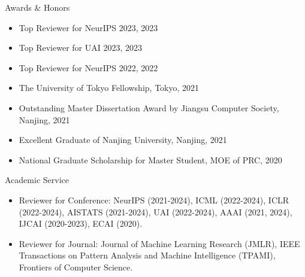 \documentclass{resume} %
\begin{document}





\begin{rSection}{Awards \& Honors}
\begin{itemize}[leftmargin=*]
\item Top Reviewer for NeurIPS 2023, 2023
\item Top Reviewer for UAI 2023, 2023
\item Top Reviewer for NeurIPS 2022, 2022
\item The University of Tokyo Fellowship, Tokyo, 2021
\item Outstanding Master Dissertation Award by Jiangsu Computer Society, Nanjing, 2021
\item Excellent Graduate of Nanjing University, Nanjing, 2021
\item National Graduate Scholarship for Master Student, MOE of PRC, 2020
\end{itemize}
\end{rSection}

\begin{rSection}{Academic Service}
\begin{itemize}[leftmargin=*]
\item Reviewer for Conference: NeurIPS (2021-2024), ICML (2022-2024), ICLR (2022-2024), AISTATS (2021-2024), UAI (2022-2024), AAAI (2021, 2024), IJCAI (2020-2023), ECAI (2020).
\item Reviewer for Journal: Journal of Machine Learning Research (JMLR), IEEE Transactions on Pattern Analysis and Machine Intelligence (TPAMI), Frontiers of Computer Science.
\end{itemize}

\end{rSection}
\end{document}
